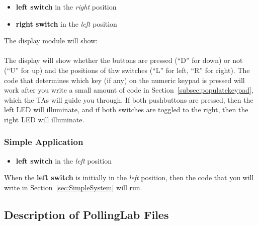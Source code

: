 \begin{itemize}
    \item \textbf{left switch} in the \textit{right} position
    \item \textbf{right switch} in the \textit{left} position
\end{itemize}

\begin{description}
\end{description}
The display module will show: \\
 \\

The display will show whether the buttons are pressed (``D'' for down) or not (``U'' for up)
and the positions of thw switches (``L'' for left, ``R'' for right).
The code that determines which key (if any) on the numeric keypad is pressed will work after you write a small amount of code in Section~\ref{subsec:populatekeypad}, which the TAs will guide you through.
If both pushbuttons are pressed, then the left LED will illuminate,
and if both switches are toggled to the right, then the right LED will illuminate.

\subsubsection{Simple Application}

\begin{itemize}
    \item \textbf{left switch} in the \textit{left} position
\end{itemize}

When the \textbf{left switch} is initially in the \textit{left} position, then the code that you will write in Section~\ref{sec:SimpleSystem} will run.


\subsection{Description of PollingLab Files}


